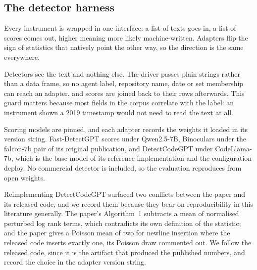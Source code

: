 \subsection{The detector harness}
\label{sec:groundtruth:harness}

Every instrument is wrapped in one interface: a list of texts goes in, a list of scores
comes out, higher meaning more likely machine-written. Adapters flip the sign of
statistics that natively point the other way, so the direction is the same everywhere.

Detectors see the text and nothing else. The driver passes plain strings rather than a
data frame, so no agent label, repository name, date or set membership can reach an
adapter, and scores are joined back to their rows afterwards. This guard matters because
most fields in the corpus correlate with the label: an instrument shown a 2019 timestamp
would not need to read the text at all.

Scoring models are pinned, and each adapter records the weights it loaded in its version
string. Fast-DetectGPT scores under Qwen2.5-7B, Binoculars under the falcon-7b pair of
its original publication, and DetectCodeGPT under CodeLlama-7b, which is the base model
of its reference implementation and the configuration \citet{ji2026exploratory} deploy.
No commercial detector is included, so the evaluation reproduces from open weights.

Reimplementing DetectCodeGPT surfaced two conflicts between the paper and its released
code, and we record them because they bear on reproducibility in this literature
generally. The paper's Algorithm~1 subtracts a mean of normalised perturbed log rank
terms, which contradicts its own definition of the statistic; and the paper gives a
Poisson mean of two for newline insertion where the released code inserts exactly one,
its Poisson draw commented out. We follow the released code, since it is the artifact
that produced the published numbers, and record the choice in the adapter version
string.

